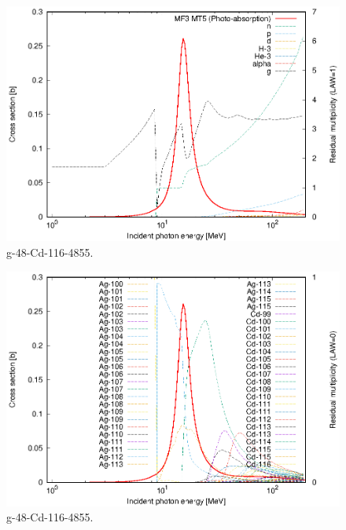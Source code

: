 \begin{figure}
 \includegraphics[width=\linewidth]{eps/g_48-Cd-116_4855.eps}
  \caption{g-48-Cd-116-4855.}
\end{figure}
\begin{figure}
 \includegraphics[width=\linewidth]{eps-law0/g_48-Cd-116_4855.eps}
 \caption{g-48-Cd-116-4855.}
\end{figure}
\newpage \clearpage

